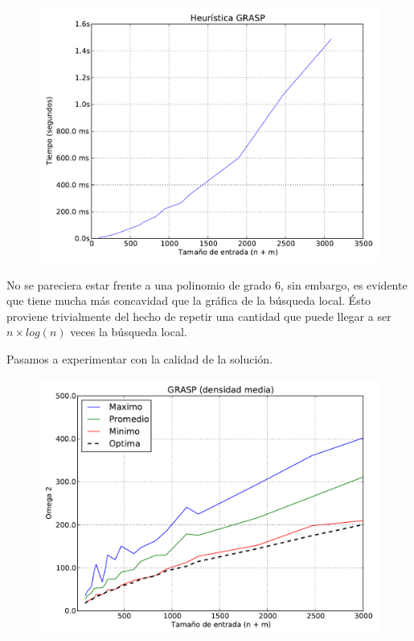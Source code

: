 \begin{figure}[H]
\begin{center}
\includegraphics[angle=0, scale=.75]{imagenes/grasp_2014-06-27_19-18-59.pdf}
\label{grafico local}
\end{center}
\end{figure}

No se pareciera estar frente a una polinomio de grado 6, sin embargo, es evidente que tiene mucha más concavidad que la gráfica de la búsqueda
local. Ésto proviene trivialmente del hecho de repetir una cantidad que puede llegar a ser $n \times log(n)$ veces la búsqueda local.

Pasamos a experimentar con la calidad de la solución.

\begin{figure}[H]
\begin{center}
\includegraphics[angle=0, scale=.75]{imagenes/calidad_grasp_2014-06-27_08-58-53.pdf}
\label{grafico local}
\end{center}
\end{figure}

